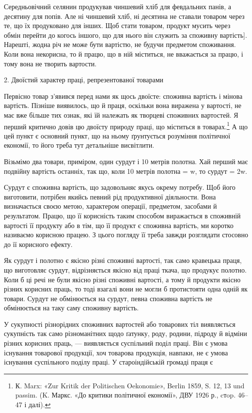 \parcont{}  %
Середньовічний селянин продукував чиншевий хліб для февдальних
панів, а десятину для попів. Але ні чиншевий хліб, ні десятина
не ставали товаром через те, що їх продуковано для інших.
Щоб стати товаром, продукт мусить через обмін перейти до когось
іншого, що для нього він служить за споживну вартість]. Нарешті,
жодна річ не може бути вартістю, не будучи предметом
споживання. Коли вона некорисна, то й працю, що в ній міститься,
не вважається за працю, і тому вона не творить вартости.

2. Двоїстий характер праці, репрезентованої товарами

Первісно товар з’явився перед нами як щось двоїсте: споживна
вартість і мінова вартість. Пізніше виявилось, що й праця, оскільки
вона виражена у вартості, не має вже більше тих ознак,
які їй належать як творцеві споживних вартостей. Я перший
критично довів цю двоїсту природу праці, що міститься в товарах.\footnote{
К. Marx: «Zur Kritik der Politischen Oekonomie», Berlin 1859,
S. 12, 13 und passim. (K. Маркс. «До критики політичної економії», ДВУ
1926 р., cтop. 46--47 і далі).
} А що цей пункт є основний пункт, що на ньому ґрунтується
розуміння політичної економії, то його треба тут детальніше
висвітлити.

Візьмімо два товари, приміром, один сурдут і 10 метрів полотна.
Хай перший має подвійну вартість останніх, так що, коли
10 метрів полотна = w, то сурдут = 2w.

Сурдут є споживна вартість, що задовольняє якусь окрему
потребу. Щоб його виготовити, потрібен якийсь певний рід продуктивної
діяльности. Вона визначається своєю метою, характером
операції, предметом, засобами й результатом. Працю, що її
корисність таким способом виражається в споживній вартості її
продукту або в тім, що її продукт є споживна вартість, ми коротко
називаємо корисною працею. З цього погляду її треба завжди
розглядати стосовно до її корисного ефекту.

Як сурдут і полотно є якісно різні споживні вартості, так само
кравецька праця, що виготовляє сурдут, відрізняється якісно
від праці ткача, що продукує полотно. Коли б ці речі не були
якісно різні споживні вартості, а тому й продукти якісно різних
корисних праць, то тоді взагалі вони не могли б протистояти одна
одній як товари. Сурдут не обмінюється на сурдут, певна споживна
вартість не обмінюється на таку саму споживну вартість.

У сукупності різнорідних споживних вартостей або товарових
тіл виявляється сукупність так само різноманітних щодо ґатунку,
роду, родини, підроду й відміни різних корисних праць, — виявляється
суспільний поділ праці. Він є умова існування товарової
продукції, хоч товарова продукція, навпаки, не є умова існування
суспільного поділу праці. У староіндійській громаді праця є
\parbreak{}  %
